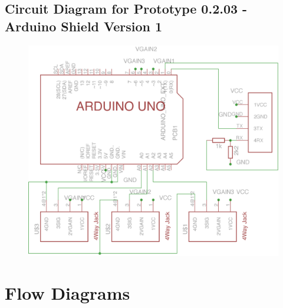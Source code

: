 \subsection{Circuit Diagram for Prototype 0.2.03 - Arduino Shield Version 1}
\label{ardshieldsch}
\begin{figure}[H]
\centering
\includegraphics[scale = 1]{Images/ard_schematic_01}
\end{figure}



\section{Flow Diagrams} \label{Flow Diagrams}

